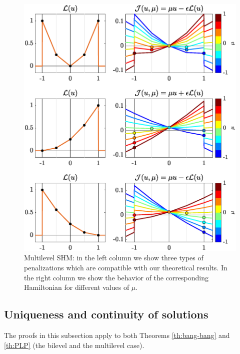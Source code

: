 \documentclass[9pt,shortpaper,twoside,web]{ieeecolor}
\begin{document}
\begin{figure}[h]
	\includegraphics[scale=0.415]{img/fig04.eps}
	\caption{Multilevel SHM: in the left column we show three types of penalizations which are compatible with our theoretical results. In the right column we show the behavior of the corresponding Hamiltonian for different values of $\mu$.}\label{fig:SHE-multi}
\end{figure} 

\subsection{Uniqueness and continuity of solutions}\label{sec: uniqueness continuity}

The proofs in this subsection apply to both Theorems \ref{th:bang-bang} and \ref{th:PLP} (the bilevel and the multilevel case).
\end{document}
